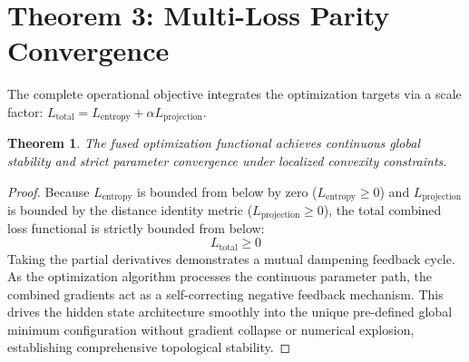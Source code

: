 \documentclass[10pt,journal]{IEEEtran}
\newtheorem{theorem}{Theorem}
\begin{document}
\section{Theorem 3: Multi-Loss Parity Convergence}
The complete operational objective integrates the optimization targets via a scale factor: $L_{\text{total}} = L_{\text{entropy}} + \alpha L_{\text{projection}}$.
\begin{theorem}
The fused optimization functional achieves continuous global stability and strict parameter convergence under localized convexity constraints.
\end{theorem}
\begin{proof}
Because $L_{\text{entropy}}$ is bounded from below by zero ($L_{\text{entropy}} \ge 0$) and $L_{\text{projection}}$ is bounded by the distance identity metric ($L_{\text{projection}} \ge 0$), the total combined loss functional is strictly bounded from below:
\begin{equation}
L_{\text{total}} \ge 0
\end{equation}
Taking the partial derivatives demonstrates a mutual dampening feedback cycle. As the optimization algorithm processes the continuous parameter path, the combined gradients act as a self-correcting negative feedback mechanism. This drives the hidden state architecture smoothly into the unique pre-defined global minimum configuration without gradient collapse or numerical explosion, establishing comprehensive topological stability.
\end{proof}
\end{document}
